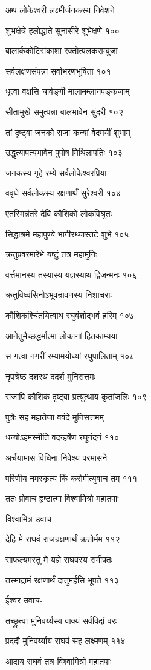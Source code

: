 अथ लोकेश्वरी लक्ष्मीर्जनकस्य निवेशने

शुभक्षेत्रे हलोद्धाते सुनासीरे शुभेक्षणे १००

बालार्ककोटिसंकाशा रक्तोत्पलकराम्बुजा

सर्वलक्षणसंपन्ना सर्वाभरणभूषिता १०१

धृत्वा वक्षसि चार्वङ्गी मालामम्लानपङ्कजाम्

सीतामुखे समुत्पन्ना बालभावेन सुंदरी १०२

तां दृष्ट्वा जनको राजा कन्यां वेदमयीं शुभाम्

उद्धृत्यापत्यभावेन पुपोष मिथिलापतिः १०३

जनकस्य गृहे रम्ये सर्वलोकेश्वरप्रिया

ववृधे सर्वलोकस्य रक्षणार्थं सुरेश्वरी १०४

एतस्मिन्नंतरे देवि कौशिको लोकविश्रुतः

सिद्धाश्रमे महापुण्ये भागीरथ्यास्तटे शुभे १०५

क्रतुप्रवरमारेभे यष्टुं तत्र महामुनिः

वर्त्तमानस्य तस्यास्य यज्ञस्याथ द्विजन्मनः १०६

क्रतुविध्वंसिनोऽभूवन्रावणस्य निशाचराः

कौशिकश्चिंतयित्वाथ रघुवंशोद्भवं हरिम् १०७

आनेतुमैच्छद्धर्मात्मा लोकानां हितकाम्यया

स गत्वा नगरीं रम्यामयोध्यां रघुपालिताम् १०८

नृपश्रेष्ठं दशरथं ददर्श मुनिसत्तमः

राजापि कौशिकं दृष्ट्वा प्रत्युत्थाय कृतांजलिः १०९

पुत्रैः सह महातेजा ववंदे मुनिसत्तमम्

धन्योऽहमस्मीति वदन्हर्षेण रघुनंदनं ११०

अर्चयामास विधिना निवेश्य परमासने

परिणीय नमस्कृत्य किं करोमीत्युवाच तम् १११

ततः प्रोवाच हृष्टात्मा विश्वामित्रो महातपाः

विश्वामित्र उवाच-

देहि मे राघवं राजन्रक्षणार्थं क्रतोर्मम ११२

साफल्यमस्तु मे यज्ञे राघवस्य समीपतः

तस्माद्रामं रक्षणार्थं दातुमर्हसि भूपते ११३

ईश्वर उवाच-

तच्छ्रुत्वा मुनिवर्य्यस्य वाक्यं सर्वविदां वरः

प्रददौ मुनिवर्य्याय राघवं सह लक्ष्मणम् ११४

आदाय राघवं तत्र विश्वामित्रो महातपाः

